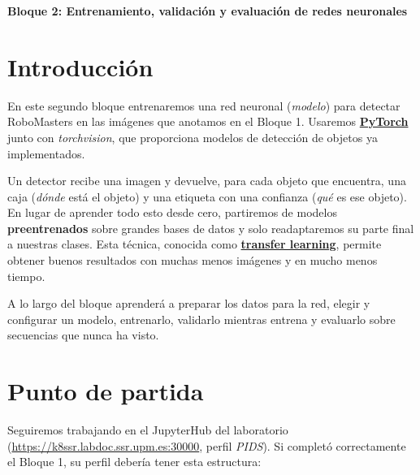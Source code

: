 \documentclass[12pt,a4paper]{article}
\begin{document}
\begin{center}
    \vspace*{.15cm}
    {\Huge \bfseries Bloque 2: Entrenamiento, validación y evaluación de redes neuronales} \\[0.5cm]
\end{center}


\section{Introducción}
\label{sec:semana2-intro}

En este segundo bloque entrenaremos una red neuronal (\textit{modelo}) para detectar RoboMasters en las imágenes que anotamos en el Bloque 1. Usaremos \underline{\textbf{PyTorch}} junto con \textit{torchvision}, que proporciona modelos de detección de objetos ya implementados.

Un detector recibe una imagen y devuelve, para cada objeto que encuentra, una caja (\textit{dónde} está el objeto) y una etiqueta con una confianza (\textit{qué} es ese objeto). En lugar de aprender todo esto desde cero, partiremos de modelos \textbf{preentrenados} sobre grandes bases de datos y solo readaptaremos su parte final a nuestras clases. Esta técnica, conocida como \underline{\textbf{transfer learning}}, permite obtener buenos resultados con muchas menos imágenes y en mucho menos tiempo.

A lo largo del bloque aprenderá a preparar los datos para la red, elegir y configurar un modelo, entrenarlo, validarlo mientras entrena y evaluarlo sobre secuencias que nunca ha visto.


\section{Punto de partida}
\label{sec:semana2-jupyterhub}

Seguiremos trabajando en el JupyterHub del laboratorio (\url{https://k8ssr.labdoc.ssr.upm.es:30000}, perfil \textit{PIDS}). Si completó correctamente el Bloque 1, su perfil debería tener esta estructura:
\end{document}
